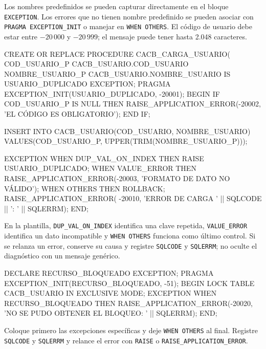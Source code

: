 \documentclass[10pt,letterpaper]{article}
\begin{document}
Los nombres predefinidos se pueden capturar directamente en el bloque
\texttt{EXCEPTION}. Los errores que no tienen nombre predefinido se pueden
asociar con \texttt{PRAGMA EXCEPTION\_INIT} o manejar en \texttt{WHEN OTHERS}.
El código de usuario debe estar entre $-20\,000$ y $-20\,999$; el mensaje puede
tener hasta 2.048 caracteres.

\begin{sqlexample}
CREATE OR REPLACE PROCEDURE CACB_CARGA_USUARIO(
  COD_USUARIO_P CACB_USUARIO.COD_USUARIO%
  NOMBRE_USUARIO_P CACB_USUARIO.NOMBRE_USUARIO%
IS
  USUARIO_DUPLICADO EXCEPTION;
  PRAGMA EXCEPTION_INIT(USUARIO_DUPLICADO, -20001);
BEGIN
  IF COD_USUARIO_P IS NULL THEN
    RAISE_APPLICATION_ERROR(-20002, 'EL CÓDIGO ES OBLIGATORIO');
  END IF;

  INSERT INTO CACB_USUARIO(COD_USUARIO, NOMBRE_USUARIO)
  VALUES(COD_USUARIO_P, UPPER(TRIM(NOMBRE_USUARIO_P)));

EXCEPTION
  WHEN DUP_VAL_ON_INDEX THEN
    RAISE USUARIO_DUPLICADO;
  WHEN VALUE_ERROR THEN
    RAISE_APPLICATION_ERROR(-20003, 'FORMATO DE DATO NO VÁLIDO');
  WHEN OTHERS THEN
    ROLLBACK;
    RAISE_APPLICATION_ERROR(
      -20010,
      'ERROR DE CARGA ' || SQLCODE || ': ' || SQLERRM);
END;
\end{sqlexample}

En la plantilla, \texttt{DUP\_VAL\_ON\_INDEX} identifica una clave repetida,
\texttt{VALUE\_ERROR} identifica un dato incompatible y \texttt{WHEN OTHERS}
funciona como último control. Si se relanza un error, conserve su causa y
registre \texttt{SQLCODE} y \texttt{SQLERRM}; no oculte el diagnóstico con un
mensaje genérico.

\begin{sqlexample}
DECLARE
  RECURSO_BLOQUEADO EXCEPTION;
  PRAGMA EXCEPTION_INIT(RECURSO_BLOQUEADO, -51);
BEGIN
  LOCK TABLE CACB_USUARIO IN EXCLUSIVE MODE;
EXCEPTION
  WHEN RECURSO_BLOQUEADO THEN
    RAISE_APPLICATION_ERROR(-20020,
      'NO SE PUDO OBTENER EL BLOQUEO: ' || SQLERRM);
END;
\end{sqlexample}

\begin{errorcritico}
Coloque primero las excepciones específicas y deje \texttt{WHEN OTHERS} al
final. Registre \texttt{SQLCODE} y \texttt{SQLERRM} y relance el error con
\texttt{RAISE} o \texttt{RAISE\_APPLICATION\_ERROR}.
\end{errorcritico}
\end{document}
